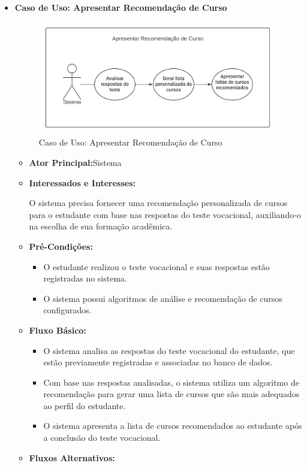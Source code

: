 \begin{itemize}
    \item \textbf{Caso de Uso: Apresentar Recomendação de Curso}

    \begin{figure}[ht]
        \centering
        \includegraphics[scale=0.8]{caso-de-uso_recomendar-curso.png}
        \caption{Caso de Uso: Apresentar Recomendação de Curso}
        \label{fig:enter-label}
    \end{figure}
    \begin{itemize}
        \item \textbf{Ator Principal:}Sistema
        \item \textbf{Interessados e Interesses:}

        O sistema precisa fornecer uma recomendação personalizada de cursos para o estudante com base nas respostas do teste vocacional, auxiliando-o na escolha de sua formação acadêmica.
        \item \textbf{Pré-Condições:}
        \begin{itemize}
            \item O estudante realizou o teste vocacional e suas respostas estão registradas no sistema.
            \item O sistema possui algoritmos de análise e recomendação de cursos configurados.
        \end{itemize}
        \item \textbf{Fluxo Básico:}
        \begin{itemize}
            \item O sistema analisa as respostas do teste vocacional do estudante, que estão previamente registradas e associadas no banco de dados.
            \item Com base nas respostas analisadas, o sistema utiliza um algoritmo de recomendação para gerar uma lista de cursos que são mais adequados ao perfil do estudante.
            \item O sistema apresenta a lista de cursos recomendados ao estudante após a conclusão do teste vocacional.
        \end{itemize}
        \item \textbf{Fluxos Alternativos:}


\end{itemize}
\end{itemize}
